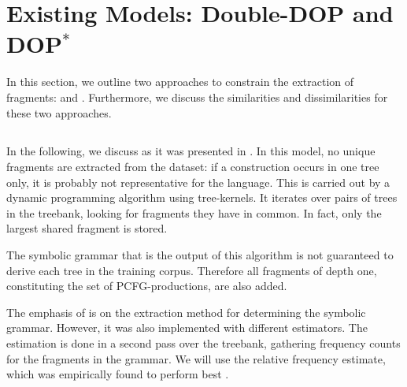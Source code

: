 
\section{Existing Models: Double-DOP and DOP$^*$}\label{sec:Existing}


In this section, we outline two approaches to constrain the extraction of fragments: \ddop{} and \dops{}. Furthermore, we discuss the similarities and dissimilarities for these two approaches. 

\subsection{\ddop}
In the following, we discuss \ddop{} as it was presented in \cite{sangati2011}. In this model, no unique fragments are extracted from the dataset: if a construction occurs in one tree only, it is probably not representative for the language. This is carried out by a dynamic programming algorithm using tree-kernels. It iterates over pairs of trees in the treebank, looking for fragments they have in common. In fact, only the largest shared fragment is stored. 

The symbolic grammar that is the output of this algorithm is not guaranteed to derive each tree in the training corpus. Therefore all fragments of depth one, constituting the set of PCFG-productions, are also added.

The emphasis of \ddop{} is on the extraction method for determining the symbolic grammar. However, it was also implemented with different estimators. The estimation is done in a second pass over the treebank, gathering frequency counts for the fragments in the grammar. We will use the relative frequency estimate, which was empirically found to perform best \cite{sangati2011}.




